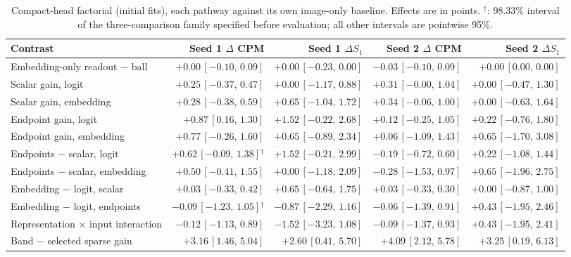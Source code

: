 \begin{table}[!t]
\centering
\footnotesize\setlength{\tabcolsep}{4pt}
\caption{Compact-head factorial (initial fits), each pathway against its own image-only baseline. Effects are in points. $^\dagger$: 98.33\% interval of the three-comparison family specified before evaluation; all other intervals are pointwise 95\%.}
\label{tab:locked_factorial}
\begin{tabular}{@{}lrrrr@{}}
\toprule
Contrast & Seed 1 $\Delta$ CPM & Seed 1 $\Delta S_1$ & Seed 2 $\Delta$ CPM & Seed 2 $\Delta S_1$ \\
\midrule
Embedding-only readout $-$ ball & $+0.00\,[-0.10,\,0.09]$ & $+0.00\,[-0.23,\,0.00]$ & $-0.03\,[-0.10,\,0.09]$ & $+0.00\,[0.00,\,0.00]$ \\
Scalar gain, logit & $+0.25\,[-0.37,\,0.47]$ & $+0.00\,[-1.17,\,0.88]$ & $+0.31\,[-0.00,\,1.04]$ & $+0.00\,[-0.47,\,1.30]$ \\
Scalar gain, embedding & $+0.28\,[-0.38,\,0.59]$ & $+0.65\,[-1.04,\,1.72]$ & $+0.34\,[-0.06,\,1.00]$ & $+0.00\,[-0.63,\,1.64]$ \\
Endpoint gain, logit & $+0.87\,[0.16,\,1.30]$ & $+1.52\,[-0.22,\,2.68]$ & $+0.12\,[-0.25,\,1.05]$ & $+0.22\,[-0.76,\,1.80]$ \\
Endpoint gain, embedding & $+0.77\,[-0.26,\,1.60]$ & $+0.65\,[-0.89,\,2.34]$ & $+0.06\,[-1.09,\,1.43]$ & $+0.65\,[-1.70,\,3.08]$ \\
Endpoints $-$ scalar, logit & $+0.62\,[-0.09,\,1.38]$$^\dagger$ & $+1.52\,[-0.21,\,2.99]$ & $-0.19\,[-0.72,\,0.60]$ & $+0.22\,[-1.08,\,1.44]$ \\
Endpoints $-$ scalar, embedding & $+0.50\,[-0.41,\,1.55]$ & $+0.00\,[-1.18,\,2.09]$ & $-0.28\,[-1.53,\,0.97]$ & $+0.65\,[-1.96,\,2.75]$ \\
Embedding $-$ logit, scalar & $+0.03\,[-0.33,\,0.42]$ & $+0.65\,[-0.64,\,1.75]$ & $+0.03\,[-0.33,\,0.30]$ & $+0.00\,[-0.87,\,1.00]$ \\
Embedding $-$ logit, endpoints & $-0.09\,[-1.23,\,1.05]$$^\dagger$ & $-0.87\,[-2.29,\,1.16]$ & $-0.06\,[-1.39,\,0.91]$ & $+0.43\,[-1.95,\,2.46]$ \\
Representation $\times$ input interaction & $-0.12\,[-1.13,\,0.89]$ & $-1.52\,[-3.23,\,1.08]$ & $-0.09\,[-1.37,\,0.93]$ & $+0.43\,[-1.95,\,2.41]$ \\
Band $-$ selected sparse gain & $+3.16\,[1.46,\,5.04]$ & $+2.60\,[0.41,\,5.70]$ & $+4.09\,[2.12,\,5.78]$ & $+3.25\,[0.19,\,6.13]$ \\
\bottomrule
\end{tabular}
\end{table}
